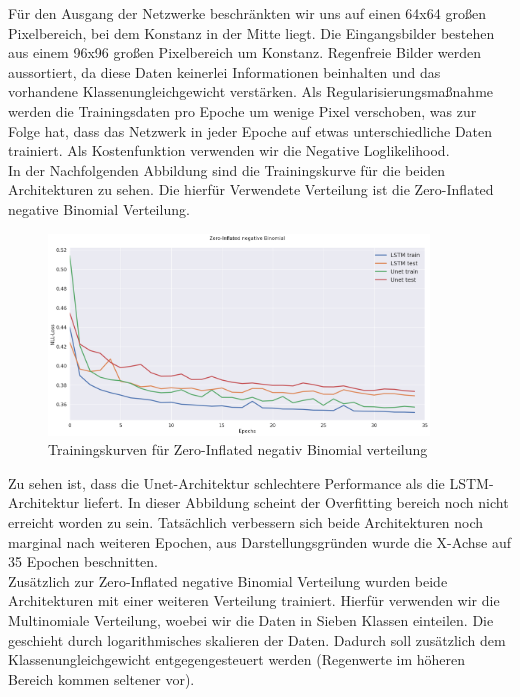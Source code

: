 \noindent Für den Ausgang der Netzwerke beschränkten wir uns auf einen 64x64 großen Pixelbereich, bei dem Konstanz in der Mitte liegt. Die Eingangsbilder bestehen aus einem 96x96 großen Pixelbereich um Konstanz. Regenfreie Bilder werden aussortiert, da diese Daten keinerlei Informationen beinhalten und das vorhandene Klassenungleichgewicht verstärken. Als Regularisierungsmaßnahme werden die Trainingsdaten pro Epoche um wenige Pixel verschoben, was zur Folge hat, dass das Netzwerk in jeder Epoche auf etwas unterschiedliche Daten trainiert. Als Kostenfunktion verwenden wir die Negative Loglikelihood.
\\

\noindent In der Nachfolgenden Abbildung sind die Trainingskurve für die beiden Architekturen zu sehen. Die hierfür Verwendete Verteilung ist die Zero-Inflated negative Binomial Verteilung.

\begin{figure}[htb]
 \centering
 \includegraphics[width=0.9\textwidth,angle=0]{abb/Loss_zinfBinom.png}
 \caption{Trainingskurven für Zero-Inflated negativ Binomial verteilung}
\label{fig:Inception-Conv-LSTM}
\end{figure}

\noindent Zu sehen ist, dass die Unet-Architektur schlechtere Performance als die LSTM-Architektur liefert. In dieser Abbildung scheint der Overfitting bereich noch nicht erreicht worden zu sein.
Tatsächlich verbessern sich beide Architekturen noch marginal nach weiteren Epochen, aus Darstellungsgründen wurde die X-Achse auf 35 Epochen beschnitten.\\

\noindent Zusätzlich zur Zero-Inflated negative Binomial Verteilung wurden beide Architekturen mit einer weiteren Verteilung trainiert. Hierfür verwenden wir die Multinomiale Verteilung, woebei wir die Daten in Sieben Klassen einteilen. Die geschieht durch logarithmisches skalieren der Daten. Dadurch soll zusätzlich dem Klassenungleichgewicht entgegengesteuert werden (Regenwerte im höheren Bereich kommen seltener vor). 

